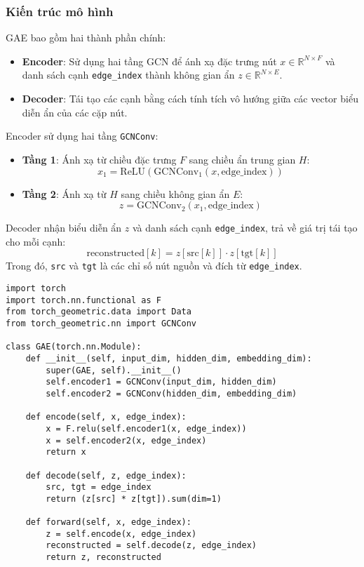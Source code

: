 \documentclass[a4paper,12pt]{article}
\begin{document}
\subsubsection{Kiến trúc mô hình}
GAE bao gồm hai thành phần chính:
\begin{itemize}
    \item \textbf{Encoder}: Sử dụng hai tầng GCN để ánh xạ đặc trưng nút \( x \in \mathbb{R}^{N \times F} \) và danh sách cạnh \texttt{edge\_index} thành không gian ẩn \( z \in \mathbb{R}^{N \times E} \).
    \item \textbf{Decoder}: Tái tạo các cạnh bằng cách tính tích vô hướng giữa các vector biểu diễn ẩn của các cặp nút.
\end{itemize}

Encoder sử dụng hai tầng \texttt{GCNConv}:
\begin{itemize}
    \item \textbf{Tầng 1}: Ánh xạ từ chiều đặc trưng \( F \) sang chiều ẩn trung gian \( H \):
    \[
    x_1 = \text{ReLU}(\text{GCNConv}_1(x, \text{edge\_index}))
    \]
    \item \textbf{Tầng 2}: Ánh xạ từ \( H \) sang chiều không gian ẩn \( E \):
    \[
    z = \text{GCNConv}_2(x_1, \text{edge\_index})
    \]
\end{itemize}

Decoder nhận biểu diễn ẩn \( z \) và danh sách cạnh \texttt{edge\_index}, trả về giá trị tái tạo cho mỗi cạnh:
\[
\text{reconstructed}[k] = z[\text{src}[k]] \cdot z[\text{tgt}[k]]
\]
Trong đó, \texttt{src} và \texttt{tgt} là các chỉ số nút nguồn và đích từ \texttt{edge\_index}.

\begin{lstlisting}[caption={Mã nguồn mô hình GAE}]
import torch
import torch.nn.functional as F
from torch_geometric.data import Data
from torch_geometric.nn import GCNConv

class GAE(torch.nn.Module):
    def __init__(self, input_dim, hidden_dim, embedding_dim):
        super(GAE, self).__init__()
        self.encoder1 = GCNConv(input_dim, hidden_dim)
        self.encoder2 = GCNConv(hidden_dim, embedding_dim)

    def encode(self, x, edge_index):
        x = F.relu(self.encoder1(x, edge_index))
        x = self.encoder2(x, edge_index)
        return x

    def decode(self, z, edge_index):
        src, tgt = edge_index
        return (z[src] * z[tgt]).sum(dim=1)

    def forward(self, x, edge_index):
        z = self.encode(x, edge_index)
        reconstructed = self.decode(z, edge_index)
        return z, reconstructed
\end{lstlisting}
\end{document}
